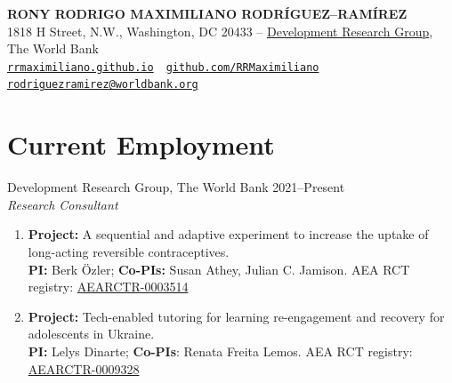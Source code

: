 \documentclass[a4paper, 10pt]{article}
\makeatletter
\renewenvironment{itemize}{
  \begin{list}{}
    { \setlength{\itemsep}{5pt}
      \setlength{\parsep}{0pt}
      \setlength{\topsep}{0pt}
      \setlength{\leftmargin}{0em} } }{
  \end{list}}
\def\myemail{rodriguezramirez@worldbank.org}
\def\myweb{rrmaximiliano.github.io}
\def\mytwitter{@rrmaximiliano}
\def\mygithub{github.com/RRMaximiliano}
\makeatother
\begin{document}
\thispagestyle{empty}

\begin{center}
  {\Large\bf RONY RODRIGO MAXIMILIANO RODRÍGUEZ--RAMÍREZ} \\
  1818 H Street, N.W., Washington, DC 20433 -- \href{https://www.worldbank.org/en/about/unit/unit-dec}{Development Research Group}, The World Bank \\
  \texttt{\href{https://rrmaximiliano.github.io}{\myweb}}\, \faLink \, \texttt{\href{https://github.com/RRMaximiliano}{\mygithub}}\, \faGithub \, \texttt{\href{mailto:\myemail}{\myemail}}\, \faEnvelope
\end{center}


\section*{Current Employment}
\begin{itemize}
\item Development Research Group, The World Bank \hfill 2021--Present \\
{\small \textit{Research Consultant} }
  \begin{enumerate}[leftmargin=10pt, label={}, nosep]
    \item {\small \textbf{Project:} A sequential and adaptive experiment to increase the uptake of long-acting reversible contraceptives.} \\ {\small \textbf{PI:} Berk Özler; \textbf{Co-PIs:} Susan Athey, Julian C. Jamison.} {\small AEA RCT registry: \href{https://www.socialscienceregistry.org/trials/3514}{AEARCTR-0003514}}
    \item {\small \textbf{Project:} Tech-enabled tutoring for learning re-engagement and recovery for adolescents in Ukraine.} \\ {\small \textbf{PI:} Lelys Dinarte; \textbf{Co-PIs}: Renata Freita Lemos.} {\small AEA RCT registry: \href{https://www.socialscienceregistry.org/trials/9328}{AEARCTR-0009328}}
  \end{enumerate}  
\end{itemize}

\end{document}
